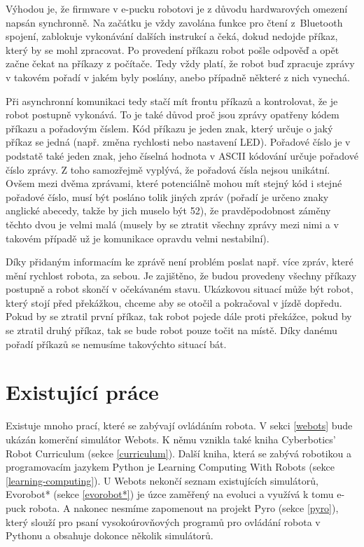     Výhodou je, že firmware v e-pucku robotovi je z důvodu hardwarových omezení
    napsán synchronně. Na začátku je vždy zavolána funkce pro čtení z~Bluetooth
    spojení, zablokuje vykonávání dalších instrukcí a čeká, dokud nedojde
    příkaz, který by se mohl zpracovat. Po provedení příkazu robot pošle
    odpověď a opět začne čekat na příkazy z počítače. Tedy vždy platí, že robot
    buď zpracuje zprávy v takovém pořadí v jakém byly poslány, anebo případně
    některé z nich vynechá.

    Při asynchronní komunikaci tedy stačí mít frontu příkazů a kontrolovat, že
    je robot postupně vykonává. To je také důvod proč jsou zprávy opatřeny
    kódem příkazu a pořadovým číslem. Kód příkazu je jeden znak, který určuje o
    jaký příkaz se jedná (např. změna rychlosti nebo nastavení LED). Pořadové
    číslo je v podstatě také jeden znak, jeho číselná hodnota v ASCII kódování
    určuje pořadové číslo zprávy. Z toho samozřejmě vyplývá, že pořadová čísla
    nejsou unikátní. Ovšem mezi dvěma zprávami, které potenciálně mohou mít
    stejný kód i stejné pořadové číslo, musí být posláno tolik jiných zpráv
    (pořadí je určeno znaky anglické abecedy, takže by jich muselo být 52), že
    pravděpodobnost záměny těchto dvou je velmi malá (musely by se ztratit
    všechny zprávy mezi nimi a v takovém případě už je komunikace opravdu velmi
    nestabilní).

    Díky přidaným informacím ke zprávě není problém poslat např. více zpráv,
    které mění rychlost robota, za sebou. Je zajištěno, že budou provedeny
    všechny příkazy postupně a robot skončí v očekávaném stavu. Ukázkovou
    situací může být robot, který stojí před překážkou, chceme aby se otočil a
    pokračoval v jízdě dopředu. Pokud by se ztratil první příkaz, tak robot
    pojede dále proti překážce, pokud by se ztratil druhý příkaz, tak se bude
    robot pouze točit na místě. Díky danému pořadí příkazů se nemusíme
    takovýchto situací bát.

    \section{Existující práce}
    \label{existujici prace}

        Existuje mnoho prací, které se zabývají ovládáním robota. V sekci
        \ref{webots} bude ukázán komerční simulátor Webots. K němu vznikla také
        kniha Cyberbotics' Robot Curriculum (sekce \ref{curriculum}). Další
        kniha, která se zabývá robotikou a programovacím jazykem Python je
        Learning Computing With Robots (sekce \ref{learning-computing}). U
        Webots nekončí seznam existujících simulátorů, Evorobot* (sekce
        \ref{evorobot*}) je úzce zaměřený na evoluci a využívá k tomu e-puck
        robota. A nakonec nesmíme zapomenout na projekt Pyro (sekce
        \ref{pyro}), který slouží pro psaní vysokoúrovňových programů pro
        ovládání robota v Pythonu a obsahuje dokonce několik simulátorů.

